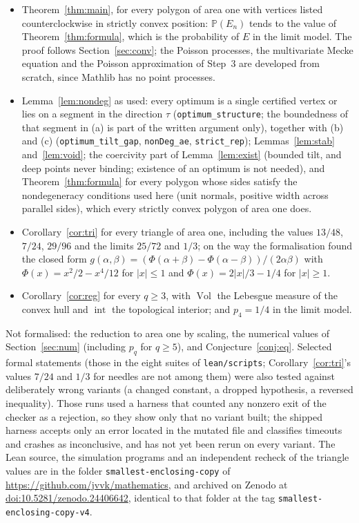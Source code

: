 \documentclass[11pt]{amsart}
\theoremstyle{remark}\newtheorem{remark}[theorem]{Remark}
\newcommand{\Prob}{\mathbb{P}}
\DeclareMathOperator{\Vol}{Vol}
\begin{document}
\begin{itemize}
\item Theorem~\ref{thm:main}, for every polygon of area one with vertices listed counterclockwise in strictly convex
position: $\Prob(E_n)$ tends to the value of Theorem~\ref{thm:formula}, which is the probability of $E$ in the limit
model. The proof follows Section~\ref{sec:conv}; the Poisson processes, the multivariate Mecke equation and the
Poisson approximation of Step~3 are developed from scratch, since Mathlib has no point processes.
\item Lemma~\ref{lem:nondeg} as used: every optimum is a single certified vertex or lies on a segment in the
direction $\tau$ (\texttt{optimum\_structure}; the boundedness of that segment in (a) is part of the written argument
only), together with (b) and (c) (\texttt{optimum\_tilt\_gap}, \texttt{nonDeg\_ae}, \texttt{strict\_rep}); Lemmas~\ref{lem:stab}
and~\ref{lem:void}; the coercivity part of Lemma~\ref{lem:exist}
(bounded tilt, and deep points never binding; existence of an optimum is not needed), and Theorem~\ref{thm:formula}
for every polygon whose sides satisfy the nondegeneracy conditions used here (unit normals, positive width across
parallel sides), which every strictly convex polygon of area one does.
\item Corollary~\ref{cor:tri} for every triangle of area one, including the values $13/48$, $7/24$, $29/96$ and the
limits $25/72$ and $1/3$; on the way the formalisation found the closed form
$g(\alpha,\beta)=(\Phi(\alpha+\beta)-\Phi(\alpha-\beta))/(2\alpha\beta)$ with $\Phi(x)=x^2/2-x^4/12$ for $|x|\le1$ and
$\Phi(x)=2|x|/3-1/4$ for $|x|\ge1$.
\item Corollary~\ref{cor:reg} for every $q\ge3$, with $\Vol$ the Lebesgue measure of the convex hull and
$\operatorname{int}$ the topological interior; and $p_4=1/4$ in the limit model.
\end{itemize}

Not formalised: the reduction to area one by scaling, the numerical values of Section~\ref{sec:num} (including
$p_q$ for $q\ge5$), and Conjecture~\ref{conj:eq}. Selected formal statements (those in the eight suites of
\texttt{lean/scripts}; Corollary~\ref{cor:tri}'s values $7/24$ and $1/3$ for needles are not among them) were also
tested against deliberately wrong variants (a changed constant, a dropped hypothesis, a reversed inequality). Those runs
used a harness that counted any nonzero exit of the checker as a rejection, so they show only that no variant built;
the shipped harness accepts only an error located in the mutated file and classifies timeouts and crashes as
inconclusive, and has not yet been rerun on every variant.
The Lean source, the simulation programs and an independent recheck of the triangle values are in the folder
\texttt{smallest-enclosing-copy} of \url{https://github.com/jvvk/mathematics}, and archived on Zenodo at
\href{https://doi.org/10.5281/zenodo.24406642}{doi:10.5281/zenodo.24406642}, identical to that folder at the tag
\texttt{smallest-enclosing-copy-v4}.
\end{document}
